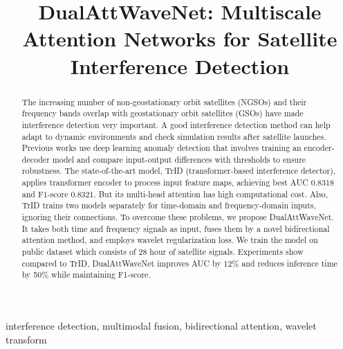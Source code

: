 \documentclass[conference]{IEEEtran}
\begin{document}
\title{DualAttWaveNet: Multiscale Attention Networks for Satellite Interference Detection}

\author{
}




\maketitle

\begin{abstract}
    The increasing number of non-geostationary orbit satellites (NGSOs) and their frequency bands overlap with geostationary orbit satellites (GSOs) have made interference detection very important. A good interference detection method can help adapt to dynamic environments and check simulation results after satellite launches. Previous works use deep learning anomaly detection that involves training an encoder-decoder model and compare input-output differences with thresholds to ensure robustness. The state-of-the-art model, TrID (transformer-based interference detector), applies transformer encoder to process input feature maps, achieving best AUC 0.8318 and F1-score 0.8321. But its multi-head attention has high computational cost. Also, TrID trains two models separately for time-domain and frequency-domain inputs, ignoring their connections. To overcome these problems, we propose DualAttWaveNet. It takes both time and frequency signals as input, fuses them by a novel bidirectional attention method, and employs wavelet regularization loss. We train the model on public dataset which consists of 28 hour of satellite signals. Experiments show compared to TrID, DualAttWaveNet improves AUC by 12\% and reduces inference time by 50\% while maintaining F1-score. \end{abstract}

\begin{IEEEkeywords}
    interference detection, multimodal fusion, bidirectional attention, wavelet transform
\end{IEEEkeywords}
\end{document}
